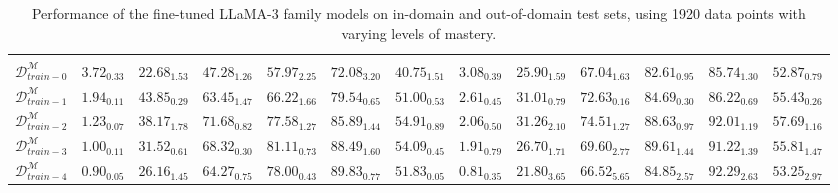 \begin{table}[!t]
{\begin{tabular}{lcccccccccccc}
    \midrule
    \rowcolor{gray!15} \multicolumn{13}{c}{$\mathcal{M}=\textit{LLaMA-3-70B}$} \\
    $\mathcal{D}_{train-0}^\mathcal{M}$ & $\mathbf{3.72}_{0.33}$ & $22.68_{1.53}$ & $47.28_{1.26}$ & $57.97_{2.25}$ & $72.08_{3.20}$ & $40.75_{1.51}$ & $\mathbf{3.08}_{0.39}$ & $25.90_{1.59}$ & $67.04_{1.63}$ & $82.61_{0.95}$ & $85.74_{1.30}$ & $52.87_{0.79}$ \\
    $\mathcal{D}_{train-1}^\mathcal{M}$ & $1.94_{0.11}$ & $\mathbf{43.85}_{0.29}$ & $63.45_{1.47}$ & $66.22_{1.66}$ & $79.54_{0.65}$ & $51.00_{0.53}$ & $2.61_{0.45}$ & $31.01_{0.79}$ & $72.63_{0.16}$ & $84.69_{0.30}$ & $86.22_{0.69}$ & $55.43_{0.26}$ \\
    $\mathcal{D}_{train-2}^\mathcal{M}$ & $1.23_{0.07}$ & $38.17_{1.78}$ & $\mathbf{71.68}_{0.82}$ & $77.58_{1.27}$ & $85.89_{1.44}$ & $\mathbf{54.91}_{0.89}$ & $2.06_{0.50}$ & $\mathbf{31.26}_{2.10}$ & $\mathbf{74.51}_{1.27}$ & $88.63_{0.97}$ & $92.01_{1.19}$ & $\mathbf{57.69}_{1.16}$ \\
    $\mathcal{D}_{train-3}^\mathcal{M}$ & $1.00_{0.11}$ & $31.52_{0.61}$ & $68.32_{0.30}$ & $\mathbf{81.11}_{0.73}$ & $88.49_{1.60}$ & $54.09_{0.45}$ & $1.91_{0.79}$ & $26.70_{1.71}$ & $69.60_{2.77}$ & $\mathbf{89.61}_{1.44}$ & $91.22_{1.39}$ & $55.81_{1.47}$ \\
    $\mathcal{D}_{train-4}^\mathcal{M}$ & $0.90_{0.05}$ & $26.16_{1.45}$ & $64.27_{0.75}$ & $78.00_{0.43}$ & $\mathbf{89.83}_{0.77}$ & $51.83_{0.05}$ & $0.81_{0.35}$ & $21.80_{3.65}$ & $66.52_{5.65}$ & $84.85_{2.57}$ & $\mathbf{92.29}_{2.63}$ & $53.25_{2.97}$ \\
    \bottomrule
    \end{tabular}
    }
    \caption{Performance of the fine-tuned LLaMA-3 family models on in-domain and out-of-domain test sets, using 1920 data points with varying levels of mastery.}
    \label{tab:1920-detail}
\end{table}
